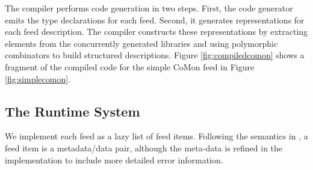 The  compiler performs code generation in two steps.
First, the code generator emits the
type declarations for each feed.  
Second, it generates representations for each feed description.  
The compiler constructs these representations
by extracting elements from the concurrently
generated \padsml{} libraries
and using polymorphic combinators to build structured 
descriptions.  Figure \ref{fig:compiledcomon} shows a fragment of
the compiled code for
the simple CoMon feed in Figure \ref{fig:simplecomon}.

\subsection{The Runtime System}
We implement each \padsd{} feed as a lazy list of feed items. 
Following the semantics in , 
a feed item is a metadata/data pair, 
although the meta-data is refined in the implementation to include
more detailed error information.



